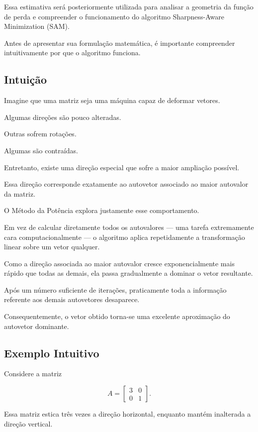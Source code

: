 \documentclass[12pt, a4paper]{article}
\begin{document}
Essa estimativa será posteriormente utilizada para analisar a geometria da função de perda e compreender o funcionamento do algoritmo Sharpness-Aware Minimization (SAM).

Antes de apresentar sua formulação matemática, é importante compreender intuitivamente por que o algoritmo funciona.

\subsection{Intuição}

Imagine que uma matriz seja uma máquina capaz de deformar vetores.

Algumas direções são pouco alteradas.

Outras sofrem rotações.

Algumas são contraídas.

Entretanto, existe uma direção especial que sofre a maior ampliação possível.

Essa direção corresponde exatamente ao autovetor associado ao maior autovalor da matriz.

O Método da Potência explora justamente esse comportamento.

Em vez de calcular diretamente todos os autovalores — uma tarefa extremamente cara computacionalmente — o algoritmo aplica repetidamente a transformação linear sobre um vetor qualquer.

Como a direção associada ao maior autovalor cresce exponencialmente mais rápido que todas as demais, ela passa gradualmente a dominar o vetor resultante.

Após um número suficiente de iterações, praticamente toda a informação referente aos demais autovetores desaparece.

Consequentemente, o vetor obtido torna-se uma excelente aproximação do autovetor dominante.

\subsection{Exemplo Intuitivo}

Considere a matriz

\[
A=
\begin{bmatrix}
3&0\\
0&1
\end{bmatrix}.
\]

Essa matriz estica três vezes a direção horizontal, enquanto mantém inalterada a direção vertical.
\end{document}
